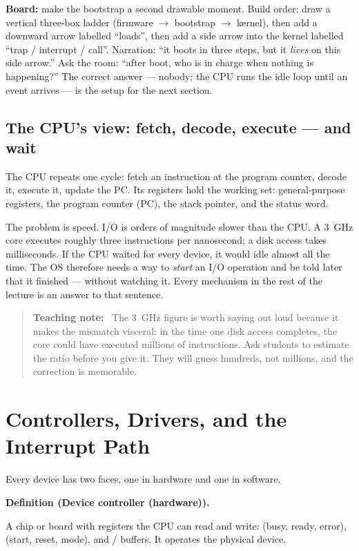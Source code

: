 \documentclass[11pt]{article}
\newenvironment{definitionbox}[1]{%
  \par\noindent\textbf{Definition (#1).}\ \itshape
}{\par\vspace{0.3em}}
\newenvironment{teachingaside}{\begin{quote}\small\color{primary-gold}\textbf{Teaching note:}\ }{\end{quote}}
\begin{document}
\textbf{Board:} make the bootstrap a second drawable moment. Build order: draw a
vertical three-box ladder (firmware $\to$ bootstrap $\to$ kernel), then add a
downward arrow labelled ``loads'', then add a side arrow into the kernel labelled
``trap / interrupt / call''. Narration: ``it boots in three steps, but it
\emph{lives} on this side arrow.'' Ask the room: ``after boot, who is in charge
when nothing is happening?'' The correct answer --- nobody; the CPU runs the idle
loop until an event arrives --- is the setup for the next section.

\subsection*{The CPU's view: fetch, decode, execute --- and wait}

The CPU repeats one cycle: fetch an instruction at the program counter, decode
it, execute it, update the PC. Its registers hold the working set:
general-purpose registers, the program counter (PC), the stack pointer, and the
status word.

The problem is speed. I/O is orders of magnitude slower than the CPU. A 3~GHz
core executes roughly three instructions per nanosecond; a disk access takes
milliseconds. If the CPU waited for every device, it would idle almost all the
time. The OS therefore needs a way to \emph{start} an I/O operation and be told
later that it finished --- without watching it. Every mechanism in the rest of
the lecture is an answer to that sentence.

\begin{teachingaside}
The 3~GHz figure is worth saying out loud because it makes the mismatch visceral:
in the time one disk access completes, the core could have executed millions of
instructions. Ask students to estimate the ratio before you give it. They will
guess hundreds, not millions, and the correction is memorable.
\end{teachingaside}

\section{Controllers, Drivers, and the Interrupt Path}

Every device has two faces, one in hardware and one in software.

\begin{definitionbox}{Device controller (hardware)}
A chip or board with registers the CPU can read and write:  (busy,
ready, error),  (start, reset, mode), and  /
 buffers. It operates the physical device.
\end{definitionbox}
\end{document}
